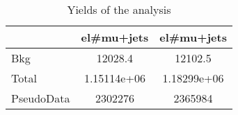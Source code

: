 \documentclass[10pt]{article}
\begin{document}
\begin{table}[htbp]
\begin{center}
\begin{tabular}{|l|S|S|}
\hline 
 & {el#mu+jets} & {el#mu+jets}\\
\hline 
  Bkg   & 12028.4  & 12102.5  \\ 
\hline 
  Total  & 1.15114e+06  & 1.18299e+06  \\ 
\hline 
  PseudoData   & 2302276 & 2365984 \\ 
\hline 
\end{tabular} 
\caption{Yields of the analysis} 
\end{center} 
\end{table} 
\end{document}
